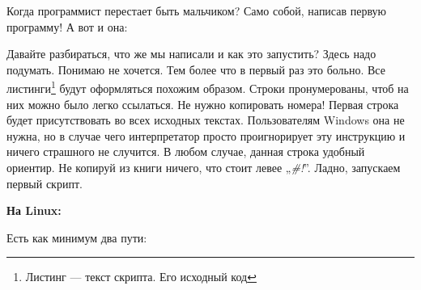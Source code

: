 Когда программист перестает быть мальчиком? Само собой, написав первую
программу! А вот и она:


Давайте разбираться, что же мы написали и как это запустить? Здесь надо
подумать. Понимаю не хочется. Тем более что в первый раз это больно. Все
листинги\footnote{Листинг --- текст скрипта. Его исходный код}
будут оформляться похожим образом. Строки пронумерованы,
чтоб на них можно было легко ссылаться. Не нужно копировать номера!
Первая строка будет присутствовать во всех исходных текстах. Пользователям
Windows она не нужна, но в случае чего интерпретатор просто проигнорирует
эту инструкцию и ничего страшного не случится. В любом случае, данная строка удобный ориентир.
Не копируй из книги ничего, что стоит левее „\emph{\#!}”. Ладно,
запускаем первый скрипт.

\textbf{На Linux:}

Есть как минимум два пути:

